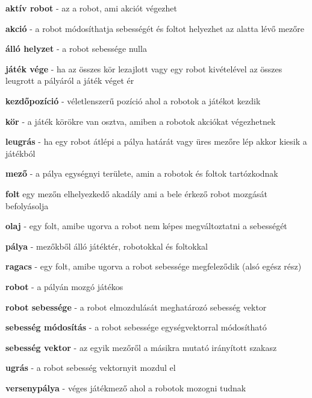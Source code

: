 \textbf{aktív robot} - az a robot, ami akciót végezhet

\textbf{akció} - a robot módosíthatja sebességét és foltot helyezhet az alatta lévő mezőre

\textbf{álló helyzet} - a robot sebessége nulla

\textbf{játék vége} - ha az összes kör lezajlott vagy egy robot kivételével az összes leugrott a pályáról a játék véget ér

\textbf{kezdőpozíció} - véletlenszerű pozíció ahol a robotok a játékot kezdik

\textbf{kör} - a játék körökre van osztva, amiben a robotok akciókat végezhetnek

\textbf{leugrás} - ha egy robot átlépi a pálya határát vagy üres mezőre lép akkor kiesik a játékból

\textbf{mező} - a pálya egységnyi területe, amin a robotok és foltok tartózkodnak

\textbf{folt} egy mezőn elhelyezkedő akadály ami a bele érkező robot mozgását befolyásolja

\textbf{olaj} - egy folt, amibe ugorva a robot nem képes megváltoztatni a sebességét

\textbf{pálya} - mezőkből álló játéktér, robotokkal és foltokkal

\textbf{ragacs} - egy folt, amibe ugorva a robot sebessége megfeleződik (alsó egész rész)

\textbf{robot} - a pályán mozgó játékos

\textbf{robot sebessége} - a robot elmozdulását meghatározó sebesség vektor

\textbf{sebesség módosítás} - a robot sebessége egységvektorral módosítható

\textbf{sebesség vektor} - az egyik mezőről a másikra mutató irányított szakasz

\textbf{ugrás} - a robot sebesség vektornyit mozdul el

\textbf{versenypálya} - véges játékmező ahol a robotok mozogni tudnak
